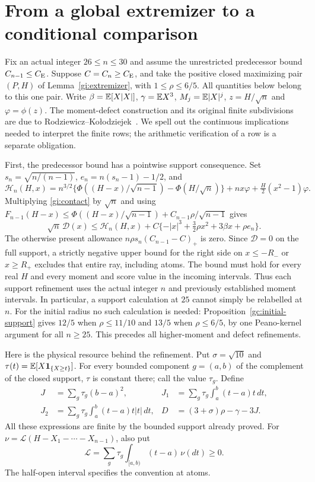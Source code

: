 \section{From a global extremizer to a conditional comparison}\label{loc:section}

Fix an actual integer $26\le n\le30$ and assume the unrestricted
predecessor bound $C_{n-1}\le C_{\mathrm E}$. Suppose $C=C_n\ge C_{\mathrm E}$, and take
the positive closed maximizing pair $(P,H)$ of
Lemma~\ref{gi:extremizer}, with $1\le\rho\le6/5$.
All quantities below belong to this one pair. Write
$\beta=\mathbb E[X|X|]$, $\gamma=\mathbb E X^3$, $M_j=\mathbb E|X|^j$,
$z=H/\sqrt n$ and $\varphi=\phi(z)$.
The moment-defect construction and its original finite subdivisions are
due to Rodziewicz--Ko\l{}odziejek~\cite{RK2026}.
We spell out the continuous implications needed to interpret the finite
rows; the arithmetic verification of a row is a separate obligation.

First, the predecessor bound has a pointwise support consequence.
Set $s_n=\sqrt{n/(n-1)}$, $e_n=n(s_n-1)-1/2$, and
\[
 \mathcal H_n(H,x)=n^{3/2}
 \{\Phi((H-x)/\sqrt{n-1})-\Phi(H/\sqrt n)\}
 +nx\varphi+\tfrac H2(x^2-1)\varphi.
\]
Multiplying \eqref{gi:contact} by $\sqrt n$ and using
$F_{n-1}(H-x)\le\Phi((H-x)/\sqrt{n-1})+
C_{n-1}\rho/\sqrt{n-1}$ gives
\begin{equation}\label{loc:support-test}
 \sqrt n\,\mathcal D(x)\le\mathcal H_n(H,x)
 +C\{-|x|^3+\tfrac32\rho x^2+3\beta x+\rho e_n\}.
\end{equation}
The otherwise present allowance
$n\rho s_n(C_{n-1}-C)_+$ is zero. Since $\mathcal D=0$ on the
full support, a strictly negative upper bound for the right side on
$x\le-R_-$ or $x\ge R_+$ excludes that entire ray, including atoms.
The bound must hold for every real $H$ and every moment and score value
in the incoming intervals. Thus each support refinement uses the actual
integer $n$ and previously established moment intervals. In particular,
a support calculation at $25$ cannot simply be relabelled at $n$.
For the initial radius no such calculation is needed:
Proposition~\ref{gc:initial-support} gives $12/5$ when $\rho\le11/10$
and $13/5$ when $\rho\le6/5$, by one Peano-kernel argument for all
$n\ge25$. This precedes all higher-moment and defect refinements.

Here is the physical resource behind the refinement. Put
$\sigma=\sqrt{10}$ and $\tau(t)=\mathbb E[X\mathbf1_{\{X\ge t\}}]$.
For every bounded component $g=(a,b)$ of the complement of the closed
support, $\tau$ is constant there; call the value $\tau_g$. Define
\begin{align*}
 J&=\sum_g\tau_g(b-a)^2,&
 J_1&=\sum_g\tau_g\int_a^b(t-a)t\,dt,\\
 J_2&=\sum_g\tau_g\int_a^b(t-a)t|t|\,dt,&
 D&=(3+\sigma)\rho-\gamma-3J.
\end{align*}
All these expressions are finite by the bounded support already proved.
For $\nu=\mathcal L(H-X_1-\cdots-X_{n-1})$, also put
\[
 \mathcal L=\sum_g\tau_g\int_{[a,b)}(t-a)\,\nu(dt)\ge0.
\]
The half-open interval specifies the convention at atoms.

